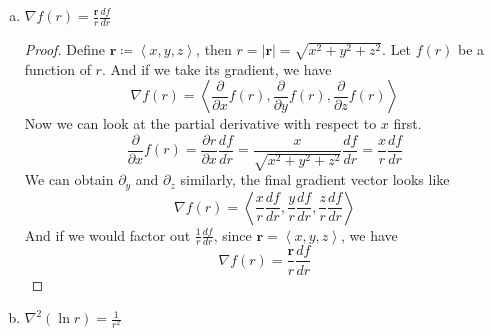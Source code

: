 \documentclass[12pt]{article}
\newcommand{\pypx}[2]{\frac{\partial #1}{\partial #2}}
\newcommand{\dydx}[2]{\frac{d #1}{d #2}}
\newcommand{\paren}[1]{\left( #1 \right)}
\newcommand{\tribkt}[1]{\left< #1 \right>}
\newcommand{\abso}[1]{\left|#1 \right|}
\begin{document}
\begin{enumerate}
\begin{enumerate}[(a)]
            \begin{proof} Define $\mathbf{r}\coloneqq \tribkt{x,y,z}$, then $r = \abso{\mathbf{r}} = \sqrt{x^2 + y^2 + z^2}$. We start by evaluating the gradient.
                \[
                \nabla r^n = \tribkt{\pypx{}{x}r^n, \pypx{}{y}r^n, \pypx{}{z}r^n}
                \]
                We can evaluate the first term in the gradient vector as an example 
                \[
                \pypx{}{x}\paren{\sqrt{x^2 + y^2 + z^2} }^n= \frac{nx}{\sqrt{x^2 + y^2 + z^2}}\paren{\sqrt{x^2 + y^2 + z^2} }^{n-1}
                \]
                We can keep simplifying the expression
                \begin{align*}
                &\frac{nx}{\sqrt{x^2 + y^2 + z^2}}\paren{\sqrt{x^2 + y^2 + z^2} }^{n-1} \\
                &= \frac{nx}{r}r^{n-1}\\
                &= nxr^{n-2}\\
                \end{align*}
                Repeat the process for all three components, and we get
                \[
                 \nabla r^n = \tribkt{nxr^{n-2},nyr^{n-2},nzr^{n-2}} = nr^{n-2}\tribkt{x,y,z}
                \]
                Since $\mathbf{r} = \tribkt{x,y,z}$, we have
                \[
                \nabla r^n = nr^{n-2}\mathbf{r}
                \]
            \end{proof}
            
            \item \( \nabla f(r) = \frac{\mathbf{r}}{r}\dydx{f}{r} \)

            \begin{proof}
                Define $\mathbf{r}\coloneqq \tribkt{x,y,z}$, then $r = \abso{\mathbf{r}} = \sqrt{x^2 + y^2 + z^2}$. Let $f(r)$ be a function of $r$. And if we take its gradient, we have
                \[
                \nabla f(r) = \tribkt{\pypx{}{x}f(r), \pypx{}{y}f(r),\pypx{}{z}f(r)}
                \]
                Now we can look at the partial derivative with respect to $x$ first.
                \[
                \pypx{}{x}f(r) = \pypx{r}{x}\dydx{f}{r} =\frac{x}{\sqrt{x^2 + y^2 + z^2}}\dydx{f}{r} = \frac{x}{r}\dydx{f}{r}
                \]
                We can obtain $\partial_y$ and $\partial_z$ similarly, the final gradient vector looks like
                \[
                \nabla f(r) = \tribkt{\frac{x}{r}\dydx{f}{r},\frac{y}{r}\dydx{f}{r},\frac{z}{r}\dydx{f}{r}}
                \]
                And if we would factor out $\frac{1}{r}\dydx{f}{r}$, since $\mathbf{r}=\tribkt{x,y,z}$, we have
                \[
                \nabla f(r) = \frac{\mathbf{r}}{r}\dydx{f}{r}
                \]
            \end{proof}
            \item \( \nabla^2\paren{\ln r} = \frac{1}{r^2} \)


\end{enumerate}
\end{enumerate}
\end{document}
